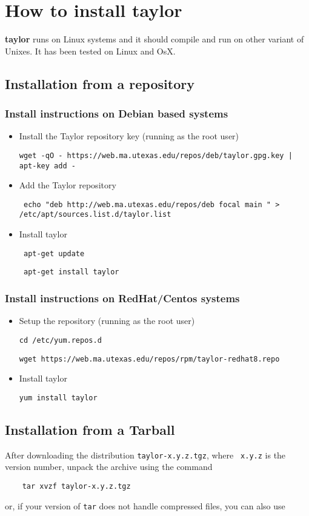 \documentclass[10pt]{article}
\theoremstyle{remark}
\newcommand{\taylorname}{{\bf taylor}}
\begin{document}
\section{How to install \taylorname{}} \label{sec:install}
\taylorname{} runs on Linux systems and it should compile and run on
other variant of Unixes. It has been tested on Linux and OsX.

\subsection{Installation from a repository}
\subsubsection*{Install instructions on Debian based systems}
\begin{itemize}
    \item {Install the Taylor repository key (running as the root
      user)
    
    
    \tt {wget -qO - https://web.ma.utexas.edu/repos/deb/taylor.gpg.key
      | apt-key add - } }
    \item{Add the Taylor repository 

    
    \tt{ echo "deb http://web.ma.utexas.edu/repos/deb focal main " >
      /etc/apt/sources.list.d/taylor.list }}
    \item{Install taylor 

    
    \tt{ apt-get update} 

    
    \tt{ apt-get install taylor}}
\end{itemize}

\subsubsection*{Install instructions on RedHat/Centos systems}
\begin{itemize}
    \item {Setup the repository (running as the root user)
    
    \tt{cd /etc/yum.repos.d}

    \tt{wget https://web.ma.utexas.edu/repos/rpm/taylor-redhat8.repo}
    }
    \item{Install taylor
    
    \tt{yum install taylor}
    
    }
\end{itemize}

\subsection{Installation from a Tarball}
After downloading the distribution {\tt taylor-x.y.z.tgz}, where {\tt
  x.y.z} is the version number, unpack the archive using the command
\begin{verbatim}
    tar xvzf taylor-x.y.z.tgz
\end{verbatim}
\noindent
or, if your version of {\tt tar} does not handle compressed files, you
can also use
\end{document}
